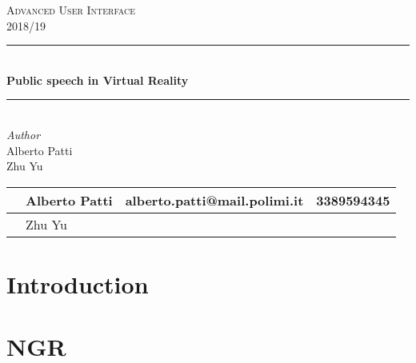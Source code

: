 \documentclass[letterpaper,12pt]{article}
\begin{document}
\begin{titlepage} %
	\newcommand{\HRule}{\rule{\linewidth}{0.5mm}} %
	
	\center %
	
	
	\textsc{\LARGE Advanced User Interface}\\[0.5cm] %
	
	\textsc{\Large 2018/19}\\[0.5cm] %
	
	
	\HRule\\[0.4cm]
	
	{\huge\bfseries Public speech in Virtual Reality}\\[0.4cm] %
	
	\HRule\\[1cm]
	
	
	\large\textit{Author}\\[0.3cm]
	Alberto Patti\\
	Zhu Yu\\[1.5cm]
	

	\begin{abstract}
	\end{abstract}
	\begin{table}[h]
		\centering
		\begin{tabular}{|l|l|l|l|}
			\hline
 			& Alberto Patti & alberto.patti@mail.polimi.it & 3389594345\\ \hline
 			& Zhu Yu & & \\ \hline
		\end{tabular}
	\end{table}
\end{titlepage}

\tableofcontents
\pagebreak
\section{Introduction}
	
	\pagebreak

\section{NGR}
	
	\pagebreak
	
\end{document}
